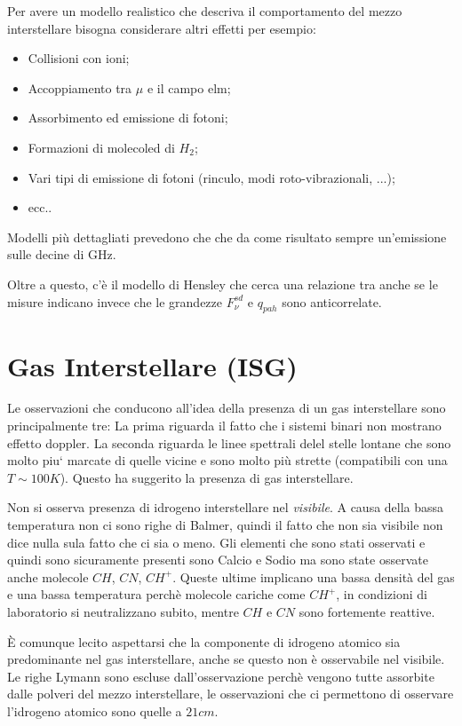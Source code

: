 Per avere un modello realistico che descriva il comportamento del mezzo interstellare bisogna considerare altri effetti per esempio:
\begin{itemize}
		\item Collisioni con ioni;
		\item Accoppiamento tra $\mu$ e il campo elm;
		\item Assorbimento ed emissione di fotoni;
		\item Formazioni di molecoled di $H_2$;
		\item Vari tipi di emissione di fotoni (rinculo, modi roto-vibrazionali, ...);
		\item ecc..
\end{itemize}
Modelli pi\`u dettagliati prevedono che
che da come risultato sempre un'emissione sulle decine di GHz.

Oltre a questo, c'\`e il modello di Hensley che cerca una relazione tra 
anche se le misure indicano invece che le grandezze $F_{\nu}^{sd}$ e $q_{pah}$ sono anticorrelate.

\section{Gas Interstellare (ISG)}
Le osservazioni che conducono all'idea della presenza di un gas interstellare sono principalmente tre: La prima riguarda il fatto che i sistemi binari non mostrano effetto doppler. La seconda riguarda le linee spettrali delel stelle lontane che sono molto piu` marcate di quelle vicine e sono molto pi\`u strette (compatibili con una $T\sim100K$). Questo ha suggerito la presenza di gas interstellare.

Non si osserva presenza di idrogeno interstellare nel \emph{visibile}. A causa della bassa temperatura non ci sono righe di Balmer, quindi il fatto che non sia visibile non dice nulla sula fatto che ci sia o meno. Gli elementi che sono stati osservati e quindi sono sicuramente presenti sono Calcio e Sodio ma sono state osservate anche molecole $CH$, $CN$, $CH^+$. Queste ultime implicano una bassa densit\`a del gas e una bassa temperatura perch\`e molecole cariche come $CH^+$, in condizioni di laboratorio si neutralizzano subito, mentre $CH$ e $CN$ sono fortemente reattive. 

\`E comunque lecito aspettarsi che la componente di idrogeno atomico sia predominante nel gas interstellare, anche se questo non \`e osservabile nel visibile. Le righe Lymann sono escluse dall'osservazione perch\`e vengono tutte assorbite dalle polveri del mezzo interstellare, le osservazioni che ci permettono di osservare l'idrogeno atomico sono quelle a $21cm$.

